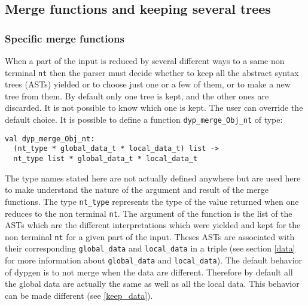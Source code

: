 \documentclass[12pt]{article}
\newcommand{\comment}[1]{}
\begin{document}
{\comment{When a priority is declared a corresponding Caml value of type \texttt{priority} is introduced with the same name. You should beware of identifier collision and not name other variables with the names of your priorities or \texttt{default\_priority}. This value can be used in action codes. All the information about relations are stored in a structure of type \texttt{priority\_data}. This structure is accessible from the action code with the record field \texttt{dyp.priority\_data}. The following function allows to know whether the relation holds between two priorities:
\begin{verbatim}
val is_relation: priority_data -> priority -> priority -> bool
\end{verbatim}
\texttt{is\_relation dyp.priority\_data p q} returns true if \texttt{p<q} holds and false otherwise. The type of the record \verb|dyp| is defined in the module \verb|Dyp| of the library \verb|dyp.cm[x]a|, see the section \ref{dyp} for more information about it. Other functions pertaining to priorities are available, see section \ref{dynamic priority} about changing the priorities at runtime.}

\subsection{Merge functions and keeping several trees}\label{merge}

\subsubsection{Specific merge functions}

When a part of the input is reduced by several different ways to a same non terminal \texttt{nt} then the parser must decide whether to keep all the abstract syntax trees (ASTs) yielded or to choose just one or a few of them, or to make a new tree from them. By default only one tree is kept, and the other ones are discarded. It is not possible to know which one is kept. The user can override the default choice. It is possible to define a function \verb|dyp_merge_Obj_nt| of type:
\begin{verbatim}
val dyp_merge_Obj_nt:
  (nt_type * global_data_t * local_data_t) list ->
  nt_type list * global_data_t * local_data_t
\end{verbatim}
The type names stated here are not actually defined anywhere but are used here to make understand the nature of the argument and result of the merge functions. The type \verb|nt_type| represents the type of the value returned when one reduces to the non terminal \verb|nt|.
The argument of the function is the list of the ASTs which are the different interpretations which were yielded and kept for the non terminal \verb|nt| for a given part of the input. Theses ASTs are associated with their corresponding \verb|global_data| and \verb|local_data| in a triple (see section \ref{data} for more information about \verb|global_data| and \verb|local_data|). The default behavior of dypgen is to not merge when the data are different. Therefore by default all the global data are actually the same as well as all the local data. This behavior can be made different (see \ref{keep_data}).\\

}
\end{document}
